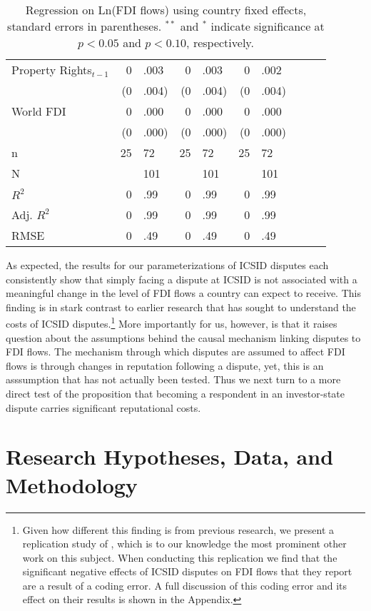 \documentclass[12pt,onesided]{amsart}
\begin{document}
\begin{table}[ht]
{\begin{tabular}{lr@{} lr@{}lr@{}lr@{}lr@{}}
  Property Rights$_{t-1}$ & 0&.003 & 0&.003 & 0&.002 \\ 
   & (0&.004) & (0&.004) & (0&.004) \\ 
  World FDI & 0&.000 & 0&.000 & 0&.000 \\ 
   & (0&.000) & (0&.000) & (0&.000) \\ 
   \hline
n & 25&72 & 25&72 & 25&72 \\ 
  N && 101 && 101 && 101 \\ 
  $R^{2}$ & 0&.99 & 0&.99 & 0&.99 \\ 
  Adj. $R^{2}$ & 0&.99 & 0&.99 & 0&.99 \\ 
  RMSE & 0&.49 & 0&.49 & 0&.49 \\ 
   \hline
\hline
\end{tabular}
}
\caption{Regression on Ln(FDI flows) using country fixed effects, standard errors in parentheses. $^{**}$ and $^{*}$ indicate significance at $p< 0.05 $ and $p< 0.10 $, respectively.} 
\label{tab:dispFDI}
\end{table}

As expected, the results for our parameterizations of ICSID disputes each consistently show that simply facing a dispute at ICSID is not associated with a meaningful change in the level of FDI flows a country can expect to receive. This finding is in stark contrast to earlier research that has sought to understand the costs of ICSID disputes.\footnote{Given how different this finding is from previous research, we present a replication study of \citet{allee:peinhardt:2011}, which is to our knowledge the most prominent other work on this subject. When conducting this replication we find that the significant negative effects of ICSID disputes on FDI flows that they report are a result of a coding error. A full discussion of this coding error and its effect on their results is shown in the Appendix.} More importantly for us, however, is that it raises question about the assumptions behind the causal mechanism linking disputes to FDI flows. The mechanism through which disputes are assumed to affect FDI flows is through changes in reputation following a dispute, yet, this is an asssumption that has not actually been tested. Thus we next turn to a more direct test of the proposition that becoming a respondent in an investor-state dispute carries significant reputational costs.

\section*{Research Hypotheses, Data, and Methodology}
\end{document}
